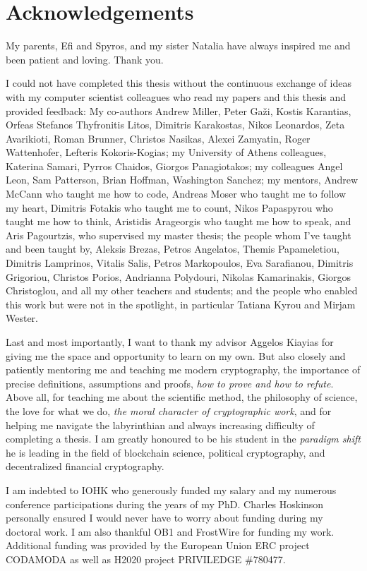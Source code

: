 \section*{Acknowledgements}

My parents, Efi and Spyros, and my sister Natalia have always inspired me and
been patient and loving. Thank you.

I could not have completed this thesis without the continuous exchange of ideas
with my computer scientist colleagues who read my papers and this thesis and
provided feedback: My co-authors Andrew Miller, Peter Ga\v{z}i, Kostis
Karantias, Orfeas Stefanos Thyfronitis Litos, Dimitris Karakostas, Nikos
Leonardos, Zeta Avarikioti, Roman Brunner, Christos Nasikas,  Alexei Zamyatin,
Roger Wattenhofer, Lefteris Kokoris-Kogias; my University of Athens colleagues,
Katerina Samari, Pyrros Chaidos, Giorgos Panagiotakos; my colleagues Angel Leon,
Sam Patterson, Brian Hoffman, Washington Sanchez; my mentors, Andrew McCann who
taught me how to code, Andreas Moser who taught me to follow my heart, Dimitris
Fotakis who taught me to count, Nikos Papaspyrou who taught me how to think,
Aristidis Arageorgis who taught me how to speak, and Aris Pagourtzis, who
supervised my master thesis; the people whom I've taught and been taught by,
Aleksis Brezas, Petros Angelatos, Themis Papameletiou, Dimitris Lamprinos,
Vitalis Salis, Petros Markopoulos, Eva Sarafianou, Dimitris Grigoriou, Christos
Porios, Andrianna Polydouri, Nikolas Kamarinakis, Giorgos Christoglou, and all
my other teachers and students; and the people who enabled this work but were
not in the spotlight, in particular Tatiana Kyrou and Mirjam Wester.

Last and most importantly, I want to thank my advisor Aggelos Kiayias for
giving me the space and opportunity to learn on my own. But also closely and
patiently mentoring me and teaching me modern cryptography, the importance of
precise definitions, assumptions and proofs, \emph{how to prove and how to
refute}. Above all, for teaching me about the scientific method, the philosophy
of science, the love for what we do, \emph{the moral character of
cryptographic work}, and for helping me navigate the labyrinthian and
always increasing difficulty of completing a thesis. I am greatly
honoured to be his student in the \emph{paradigm shift} he is leading in the
field of blockchain science, political cryptography, and decentralized financial
cryptography.

I am indebted to IOHK who generously funded my salary and my numerous conference
participations during the years of my PhD. Charles Hoskinson personally ensured
I would never have to worry about funding during my doctoral work. I am also
thankful OB1 and FrostWire for funding my work. Additional funding was provided
by the European Union ERC project CODAMODA as well as H2020 project PRIVILEDGE
\#780477.
